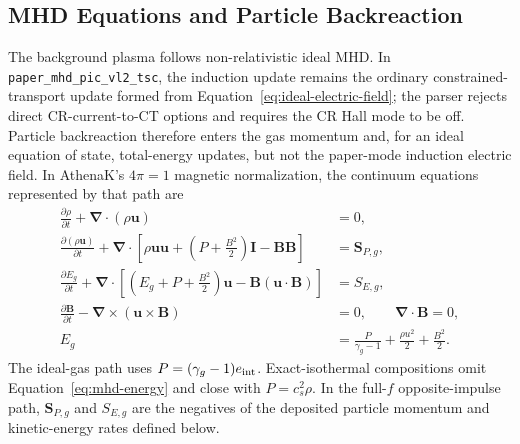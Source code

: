 \documentclass[twocolumn]{aastex701}
\newcommand{\runtime}{\texttt{paper\_mhd\_pic\_vl2\_tsc}\xspace}
\begin{document}
\subsection{MHD Equations and Particle Backreaction}

The background plasma follows non-relativistic ideal MHD. In \runtime, the
induction update remains the ordinary constrained-transport update formed from
Equation~\ref{eq:ideal-electric-field}; the parser rejects direct
CR-current-to-CT options and requires the CR Hall mode to be off. Particle
backreaction therefore enters the gas momentum and, for an ideal equation of
state, total-energy updates, but not the paper-mode induction electric field.
In AthenaK's $4\pi=1$ magnetic normalization, the continuum equations represented
by that path are
\begin{align}
\frac{\partial \rho}{\partial t}
 + \boldsymbol{\nabla}\cdot(\rho\boldsymbol{u}) &= 0,
\label{eq:mhd-mass}\\
\frac{\partial(\rho\boldsymbol{u})}{\partial t}
 + \boldsymbol{\nabla}\cdot\left[
\rho\boldsymbol{u}\boldsymbol{u}
+\left(P+\frac{B^2}{2}\right)\boldsymbol{I}
-\boldsymbol{B}\boldsymbol{B}\right] &= \boldsymbol{S}_{P,g},
\label{eq:mhd-momentum}\\
\frac{\partial E_g}{\partial t}
 + \boldsymbol{\nabla}\cdot\left[
\left(E_g+P+\frac{B^2}{2}\right)\boldsymbol{u}
-\boldsymbol{B}(\boldsymbol{u}\cdot\boldsymbol{B})\right] &= S_{E,g},
\label{eq:mhd-energy}\\
\frac{\partial\boldsymbol{B}}{\partial t}
-\boldsymbol{\nabla}\times(\boldsymbol{u}\times\boldsymbol{B}) &= 0,
\qquad \boldsymbol{\nabla}\cdot\boldsymbol{B}=0,
\label{eq:mhd-induction}\\
E_g &= \frac{P}{\gamma_g-1}
+\frac{\rho u^2}{2}+\frac{B^2}{2}.
\label{eq:mhd-total-energy}
\end{align}
The ideal-gas path uses $P=(\gamma_g-1)e_{\rm int}$. Exact-isothermal
compositions omit Equation~\ref{eq:mhd-energy} and close with
$P=c_s^2\rho$. In the full-$f$ opposite-impulse path,
$\boldsymbol{S}_{P,g}$ and $S_{E,g}$ are the negatives of the deposited
particle momentum and kinetic-energy rates defined below.
\end{document}

